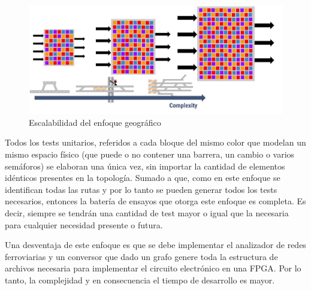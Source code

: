 			\begin{figure}[h]
			\centering
				\includegraphics[scale=.4]{./Figures/Geografico_complejidad}
				\caption{Escalabilidad del enfoque geográfico}
				\label{fig:Escala_Geografico}
			\end{figure}
		
			Todos los tests unitarios, referidos a cada bloque del mismo color que modelan un mismo espacio físico (que puede o no contener una barrera, un cambio o varios semáforos) se elaboran una única vez, sin importar la cantidad de elementos idénticos presentes en la topología. Sumado a que, como en este enfoque se identifican todas las rutas y por lo tanto se pueden generar todos los tests necesarios, entonces la batería de ensayos que otorga este enfoque es completa. Es decir, siempre se tendrán una cantidad de test mayor o igual que la necesaria para cualquier necesidad presente o futura.
		
			Una desventaja de este enfoque es que se debe implementar el analizador de redes ferroviarias y un conversor que dado un grafo genere toda la estructura de archivos necesaria para implementar el circuito electrónico en una FPGA. Por lo tanto, la complejidad y en consecuencia el tiempo de desarrollo es mayor.
			
			
			
